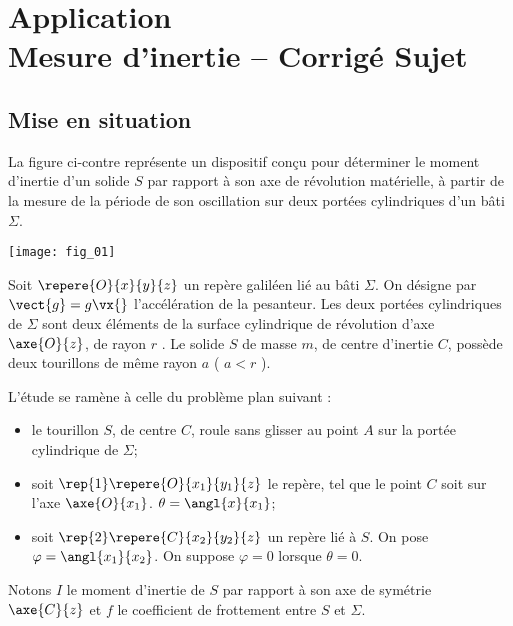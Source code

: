 \chapter*{Application  \\ 
Mesure d'inertie -- \ifprof Corrigé \else Sujet \fi}

\iflivret {} \else
\ifprof  {} \else \fi
\fi

\setcounter{question}{0}






\section*{Mise en situation}
La figure ci-contre représente un dispositif conçu pour déterminer le moment d’inertie d’un solide $S$ par
rapport à son axe de révolution matérielle, à partir de la mesure de la période de son oscillation sur deux
portées cylindriques d’un bâti $\Sigma$.

\begin{center}
\texttt{[image: fig\_01]}
\end{center}
Soit $\repere{O}{x}{y}{z}$ un repère galiléen lié au bâti $\Sigma$. On désigne par $\vect{g}=g\vx{}$ l'accélération de la pesanteur. Les deux portées cylindriques de $\Sigma$ sont deux éléments de la surface cylindrique de révolution d’axe $\axe{O}{z}$, de rayon $r$ .
Le solide $S$ de masse $m$, de centre d’inertie $C$, possède deux tourillons de même rayon $a$ ( $a<r$ ).

L’étude se ramène à celle du problème plan suivant :
\begin{itemize}
\item le tourillon $S$, de centre $C$, roule sans glisser au point $A$ sur la portée cylindrique de $\Sigma$;
\item soit $\rep{1}\repere{O}{x_1}{y_1}{z}$ le repère, tel que le point $C$ soit sur l’axe $\axe{O}{x_1}$. $\theta=\angl{x}{x_1}$;
\item soit $\rep{2}\repere{C}{x_2}{y_2}{z}$ un repère lié à $S$. On pose $\varphi =\angl{x_1}{x_2}$. On suppose $\varphi=0$ lorsque $\theta=0$.
\end{itemize}
Notons $I$ le moment d’inertie de $S$ par rapport à son axe de symétrie $\axe{C}{z}$  et $f$ le coefficient de frottement entre $S$ et $\Sigma$.

